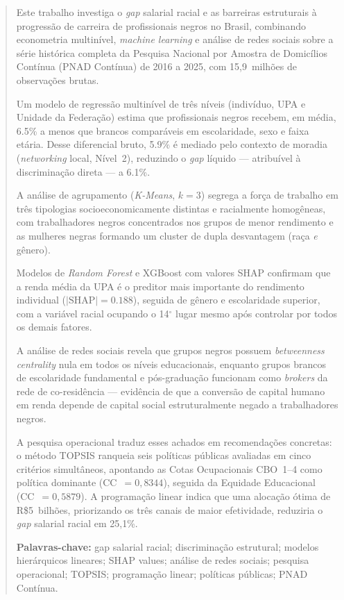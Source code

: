 \documentclass[12pt, a4paper, oneside]{article}
\begin{document}
\begin{abstract}
\noindent
Este trabalho investiga o \textit{gap} salarial racial e as barreiras
estruturais à progressão de carreira de profissionais negros no Brasil,
combinando econometria multinível, \textit{machine learning} e análise de
redes sociais sobre a série histórica completa da Pesquisa Nacional por
Amostra de Domicílios Contínua (PNAD Contínua) de 2016 a 2025, com
15,9~milhões de observações brutas.

Um modelo de regressão multinível de três níveis (indivíduo, UPA e Unidade
da Federação) estima que profissionais negros recebem, em média,
6.5\% a menos que brancos comparáveis em escolaridade, sexo e faixa etária.
Desse diferencial bruto, 5.9\% é mediado pelo contexto de moradia
(\textit{networking} local, Nível~2), reduzindo o \textit{gap} líquido
--- atribuível à discriminação direta --- a 6.1\%.

A análise de agrupamento (\textit{K-Means}, $k=3$) segrega a força de trabalho
em três tipologias socioeconomicamente distintas e racialmente homogêneas,
com trabalhadores negros concentrados nos grupos de menor rendimento e as
mulheres negras formando um cluster de dupla desvantagem (raça \textit{e}
gênero).

Modelos de \textit{Random Forest} e XGBoost com valores SHAP confirmam que
a renda média da UPA é o preditor mais importante do rendimento individual
($|\text{SHAP}| = 0.188$), seguida de gênero e escolaridade superior,
com a variável racial ocupando o 14$^\circ$ lugar mesmo após
controlar por todos os demais fatores.

A análise de redes sociais revela que grupos negros possuem
\textit{betweenness centrality} nula em todos os níveis educacionais,
enquanto grupos brancos de escolaridade fundamental e pós-graduação
funcionam como \textit{brokers} da rede de co-residência --- evidência
de que a conversão de capital humano em renda depende de capital social
estruturalmente negado a trabalhadores negros.

A pesquisa operacional traduz esses achados em recomendações concretas:
o método TOPSIS ranqueia seis políticas públicas avaliadas em cinco
critérios simultâneos, apontando as Cotas Ocupacionais CBO~1--4 como
política dominante (CC~$=0,8344$), seguida da
Equidade Educacional (CC~$=0,5879$).
A programação linear indica que uma alocação ótima de R\$5~bilhões,
priorizando os três canais de maior efetividade, reduziria o
\textit{gap} salarial racial em 25,1\%.

\bigskip
\noindent\textbf{Palavras-chave:} gap salarial racial; discriminação estrutural; modelos
hierárquicos lineares; SHAP values; análise de redes sociais; pesquisa
operacional; TOPSIS; programação linear; políticas públicas; PNAD Contínua.
\end{abstract}
\end{document}
